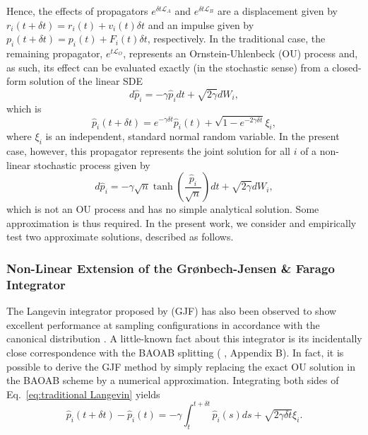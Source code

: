 \documentclass[
aip,
jcp,
reprint,
]{revtex4-1}
\begin{document}
Hence, the effects of propagators $e^{\delta t \mathcal{L}_A}$ and $e^{\delta t \mathcal{L}_B}$ are a displacement given by $r_i(t+\delta t) = r_i(t) + v_i(t) \delta t$ and an impulse given by $p_i(t+\delta t) = p_i(t) + F_i(t) \delta t$, respectively.
In the traditional case, the remaining propagator, $e^{t \mathcal{L}_O}$, represents an Ornstein-Uhlenbeck (OU) process and, as such, its effect can be evaluated exactly (in the stochastic sense) from a closed-form solution of the linear SDE
\begin{equation}
\label{eq:traditional Langevin}
d\hat{p}_i = - \gamma \hat{p}_i dt + \sqrt{2 \gamma} dW_i,
\end{equation}
which is
\begin{equation}
\label{eq:Ornestein-Uhlenbeck solution}
\hat{p}_i(t+\delta t) = e^{-\gamma \delta t} \hat{p}_i(t) + \sqrt{1 - e^{-2 \gamma \delta t}} \xi_i,
\end{equation}
where $\xi_i$ is an independent, standard normal random variable.
In the present case, however, this propagator represents the joint solution for all $i$ of a non-linear stochastic process given by
\begin{equation}
\label{eq:Langevin equation with new velocity}
d\hat{p}_i = - \gamma \sqrt{n} \tanh\left(\frac{\hat{p}_i}{\sqrt{n}}\right) dt + \sqrt{2 \gamma} dW_i,
\end{equation}
which is not an OU process and has no simple analytical solution.
Some approximation is thus required.
In the present work, we consider and empirically test two approximate solutions, described as follows.

\subsubsection{Non-Linear Extension of the Gr{\o}nbech-Jensen \& Farago Integrator}

The Langevin integrator proposed by \citeauthor{Gronbech-jensen_2013} \cite{Gronbech-jensen_2013} (GJF) has also been observed to show excellent performance at sampling configurations in accordance with the canonical distribution \cite{Jensen_2019, Farago_2019, Finkelstein_2019}.
A little-known fact about this integrator is its incidentally close correspondence with the BAOAB splitting (\citeauthor{Li_2017} \cite{Li_2017}, Appendix B).
In fact, it is possible to derive the GJF method by simply replacing the exact OU solution in the BAOAB scheme by a numerical approximation.
Integrating both sides of Eq.~\eqref{eq:traditional Langevin} yields
\begin{equation*}
\hat{p}_i(t+\delta t) - \hat{p}_i(t) = - \gamma \int_t^{t+\delta t} \hat{p}_i(s) ds + \sqrt{2 \gamma \delta t} \xi_i.
\end{equation*}
\end{document}
